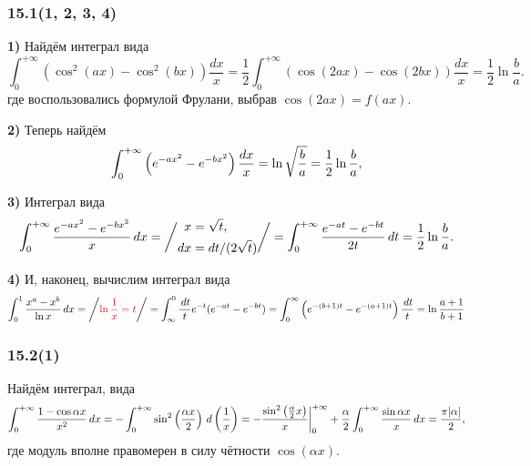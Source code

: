 \subsubsection*{15.1(1, 2, 3, 4)}

\textbf{1)} Найдём интеграл вида
\begin{equation*}
    \int_{0}^{+\infty}  \left(
        \cos^2 (ax) - \cos^2 (bx)
    \right) \frac{dx}{x} = \frac{1}{2} \int_{0}^{+\infty}  \left(
        \cos(2ax) - \cos(2 b x)
    \right) \frac{dx}{x} = \frac{1}{2} \ln \frac{b}{a}.
\end{equation*}
где воспользовались формулой Фрулани, выбрав $\cos (2ax) = f(ax)$. 

\textbf{2)} Теперь найдём
\begin{equation*}
    \int_{0}^{+\infty}  \left(
        e^{-ax^2} - e^{-bx^2}
    \right) \frac{dx}{x} = \ln \sqrt{\frac{b}{a}} = \frac{1}{2} \ln \frac{b}{a},
\end{equation*}

\textbf{3)} Интеграл вида
\begin{equation*}
    \int_{0}^{+\infty} \frac{e^{-ax^2}-e^{-bx^2}}{x} \, d x = \bigg/
        \begin{aligned}
            x &= \sqrt{t}, \\
            dx &= dt/(2\sqrt{t}) 
        \end{aligned}
    \bigg/ = 
    \int_{0}^{+\infty}
    \frac{e^{-a t}-e^{-b t}}{2 t} \, d t = \frac{1}{2} \ln \frac{b}{a}.
\end{equation*}

\textbf{4)} И, наконец, вычислим интеграл вида
\begin{equation*}
    \int_0^1 \frac{x^a - x^b}{\ln x} \d x = \bigg/
    \red{
        \ln \frac{1}{x} = t
    }
    \bigg/ = 
    \int_{\infty}^0 \frac{\d t}{t} e^{-t} (e^{-at} - e^{-bt}) = 
    \int_0^\infty \l(
        e^{-(b+1)t} - e^{-(a+1)t}
    \r) \frac{\d t}{t} = \ln \frac{a+1}{b+1}
\end{equation*}



\subsubsection*{15.2(1)}

Найдём интеграл, вида
\begin{equation*}
    \int_0^{+\infty} \frac{1 - \cos \alpha x}{x^2} \, d x = -\int_0^{+\infty} \sin^2 \left(
        \frac{\alpha x}{2}
    \right) \, d \left(\frac{1}{x}\right) = - \frac{\sin^2 \left(\frac{\alpha}{2}x\right)}{x} \bigg|_0^{+\infty} + 
    \frac{\alpha}{2} \int_0^{+\infty} \frac{\sin \alpha x}{x} \, d x = \frac{\pi |\alpha|}{2},
\end{equation*}
где модуль вполне правомерен в силу чётности $\cos (\alpha x)$.


